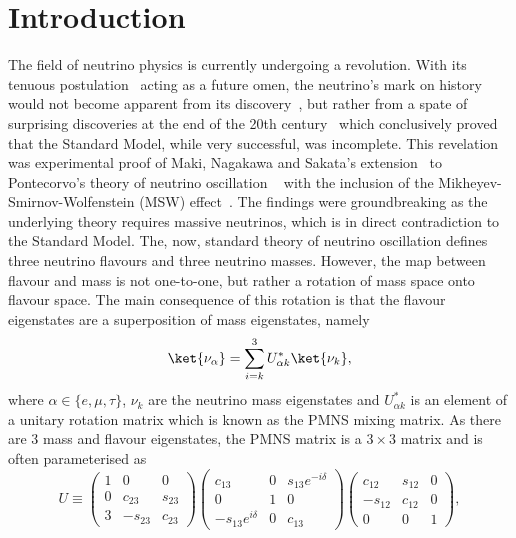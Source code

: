 \chapter{Introduction}
\label{chap:Introduction}


The field of neutrino physics is currently undergoing a revolution.  With its tenuous postulation~\cite{PauliOpenLetter} acting as a future omen, the neutrino's mark on history would not become apparent from its discovery~\cite{Cowan20071956, PhysRevLett.9.36, Kodama2001218}, but rather from a spate of surprising discoveries at the end of the 20th century~\cite{PhysRevLett.81.1562, PhysRevLett.87.071301, PhysRevLett.90.021802} which conclusively proved that the Standard Model, while very successful, was incomplete.  This revelation was experimental proof of Maki, Nagakawa and Sakata's extension~\cite{Maki01111962} to Pontecorvo's theory of neutrino oscillation ~\cite{Pontecorvo} with the inclusion of the Mikheyev-Smirnov-Wolfenstein (MSW) effect~\cite{PhysRevD.17.2369,Mikheev:1986gs}.  The findings were groundbreaking as the underlying theory requires massive neutrinos, which is in direct contradiction to the Standard Model.  The, now, standard theory of neutrino oscillation defines three neutrino flavours and three neutrino masses.  However, the map between flavour and mass is not one-to-one, but rather a rotation of mass space onto flavour space.  The main consequence of this rotation is that the flavour eigenstates are a superposition of mass eigenstates, namely
\begin{equation}
\ket{\nu_\alpha} = \sum^{3}_{i=k}U^{\ast}_{\alpha k}\ket{\nu_k},
\label{eq:NeutrinoEigenstates}
\end{equation}
where $\alpha \in \{e,\mu, \tau\}$, $\nu_k$ are the neutrino mass eigenstates and $U^{\ast}_{\alpha k}$ is an element of a unitary rotation matrix which is known as the PMNS mixing matrix.  As there are 3 mass and flavour eigenstates, the PMNS matrix is a $3\times3$ matrix and is often parameterised as 
\begin{equation}
U \equiv
\begin{pmatrix}
1 & 0 & 0 \\
0 & c_{23} & s_{23} \\
3 & -s_{23} & c_{23}
\end{pmatrix}
\begin{pmatrix}
c_{13} & 0 & s_{13}e^{-i\delta} \\
0 & 1 & 0 \\
-s_{13}e^{i\delta} & 0 & c_{13} 
\end{pmatrix}
\begin{pmatrix}
c_{12} & s_{12} & 0 \\
-s_{12} & c_{12} & 0 \\
0 & 0 & 1
\end{pmatrix}
,
\label{eq:PMNSMatrix}
\end{equation}
